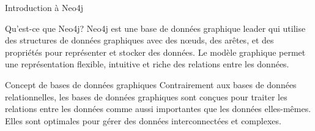 \begin{frame}{Introduction à Neo4j}
  \begin{block}{Qu'est-ce que Neo4j?}
    Neo4j est une base de données graphique leader qui utilise des structures de données graphiques avec des nœuds, des arêtes, et des propriétés pour représenter et stocker des données. Le modèle graphique permet une représentation flexible, intuitive et riche des relations entre les données.
  \end{block}
  \begin{block}{Concept de bases de données graphiques}
    Contrairement aux bases de données relationnelles, les bases de données graphiques sont conçues pour traiter les relations entre les données comme aussi importantes que les données elles-mêmes. Elles sont optimales pour gérer des données interconnectées et complexes.
  \end{block}
\end{frame}